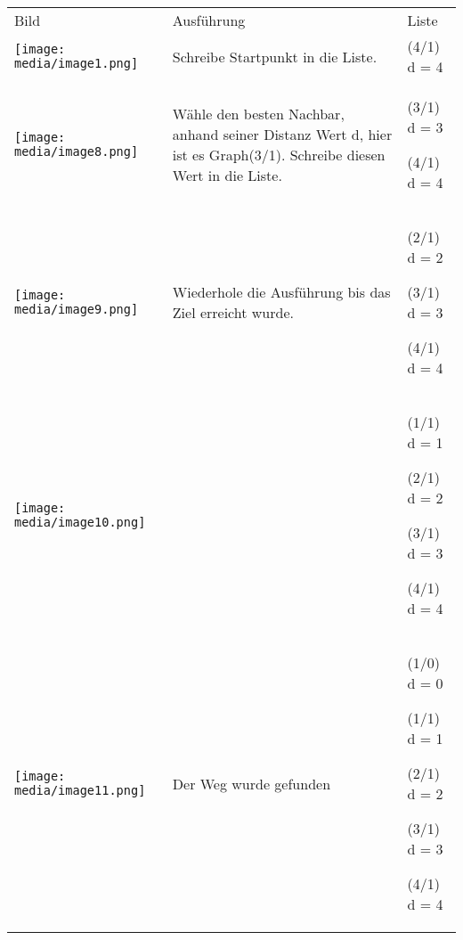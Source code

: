 \begin{longtable}[]{@{}lll@{}}
\toprule
\endhead
Bild & Ausführung & Liste\tabularnewline
\texttt{[image: media/image1.png]} &
Schreibe Startpunkt in die Liste. & (4/1) d = 4\tabularnewline
\begin{minipage}[t]{0.30\columnwidth}\raggedright
\texttt{[image: media/image8.png]}\strut
\end{minipage} & \begin{minipage}[t]{0.30\columnwidth}\raggedright
Wähle den besten Nachbar, anhand seiner Distanz Wert d, hier ist es
Graph(3/1). Schreibe diesen Wert in die Liste.\strut
\end{minipage} & \begin{minipage}[t]{0.30\columnwidth}\raggedright
(3/1) d = 3

(4/1) d = 4\strut
\end{minipage}\tabularnewline
\begin{minipage}[t]{0.30\columnwidth}\raggedright
\texttt{[image: media/image9.png]}\strut
\end{minipage} & \begin{minipage}[t]{0.30\columnwidth}\raggedright
Wiederhole die Ausführung bis das Ziel erreicht wurde.\strut
\end{minipage} & \begin{minipage}[t]{0.30\columnwidth}\raggedright
(2/1) d = 2

(3/1) d = 3

(4/1) d = 4\strut
\end{minipage}\tabularnewline
\begin{minipage}[t]{0.30\columnwidth}\raggedright
\texttt{[image: media/image10.png]}\strut
\end{minipage} & \begin{minipage}[t]{0.30\columnwidth}\raggedright
\strut
\end{minipage} & \begin{minipage}[t]{0.30\columnwidth}\raggedright
(1/1) d = 1

(2/1) d = 2

(3/1) d = 3

(4/1) d = 4\strut
\end{minipage}\tabularnewline
\begin{minipage}[t]{0.30\columnwidth}\raggedright
\texttt{[image: media/image11.png]}\strut
\end{minipage} & \begin{minipage}[t]{0.30\columnwidth}\raggedright
Der Weg wurde gefunden\strut
\end{minipage} & \begin{minipage}[t]{0.30\columnwidth}\raggedright
(1/0) d = 0

(1/1) d = 1

(2/1) d = 2

(3/1) d = 3

(4/1) d = 4\strut
\end{minipage}\tabularnewline
\bottomrule
\end{longtable}

